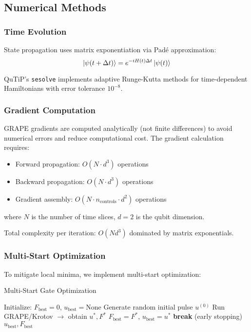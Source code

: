 \documentclass[11pt,a4paper]{article}
\theoremstyle{definition}
\theoremstyle{remark}
\begin{document}
\subsection{Numerical Methods}

\subsubsection{Time Evolution}

State propagation uses matrix exponentiation via Padé approximation:
\begin{equation}
\ket{\psi(t+\Delta t)} = e^{-iH(t)\Delta t}\ket{\psi(t)}
\end{equation}

QuTiP's \texttt{sesolve} implements adaptive Runge-Kutta methods for time-dependent Hamiltonians with error tolerance $10^{-8}$.

\subsubsection{Gradient Computation}

GRAPE gradients are computed analytically (not finite differences) to avoid numerical errors and reduce computational cost. The gradient calculation requires:
\begin{itemize}
    \item Forward propagation: $O(N \cdot d^3)$ operations
    \item Backward propagation: $O(N \cdot d^3)$ operations
    \item Gradient assembly: $O(N \cdot n_{\text{controls}} \cdot d^2)$ operations
\end{itemize}
where $N$ is the number of time slices, $d=2$ is the qubit dimension.

Total complexity per iteration: $O(N d^3)$ dominated by matrix exponentials.

\subsubsection{Multi-Start Optimization}

To mitigate local minima, we implement multi-start optimization:

\begin{algorithm}
\caption{Multi-Start Gate Optimization}
\begin{algorithmic}[1]
\STATE Initialize: $F_{\text{best}} = 0$, $u_{\text{best}} = \text{None}$
    \STATE Generate random initial pulse $u^{(0)}$
    \STATE Run GRAPE/Krotov $\rightarrow$ obtain $u^*, F^*$
        \STATE $F_{\text{best}} = F^*$, $u_{\text{best}} = u^*$
    \ENDIF
        \STATE \textbf{break} (early stopping)
    \ENDIF
\ENDFOR
\RETURN $u_{\text{best}}, F_{\text{best}}$
\end{algorithmic}
\end{algorithm}
\end{document}
